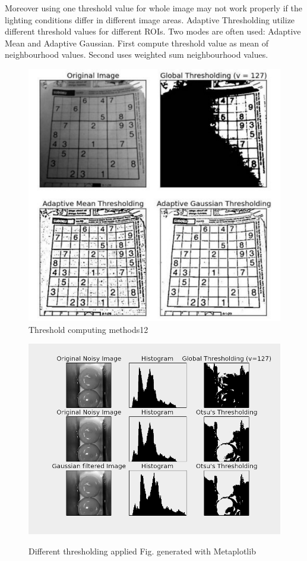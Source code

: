 \documentclass[12pt,twoside,a4paper]{article}
\begin{document}
Moreover using one threshold value for whole image may not work properly if the lighting conditions differ in different image areas.\cite{thre}
Adaptive Thresholding utilize different threshold values for different ROIs.
Two modes are often used: Adaptive Mean and Adaptive Gaussian.
First compute threshold value as mean of neighbourhood values.
Second uses weighted sum neighbourhood values.
 
\begin{figure}[H]
\centering
\includegraphics[width=0.4\paperwidth]{thremeth}
\caption{Threshold computing methods12\cite{thre}}\label{fig:thremeth}
\end{figure}
 
\begin{figure}[H]
\centering
\includegraphics[width=0.4\paperwidth]{diffthr}\label{fig:diffthr}
\caption{Different thresholding applied
Fig. generated with Metaplotlib}
\end{figure}
\end{document}
